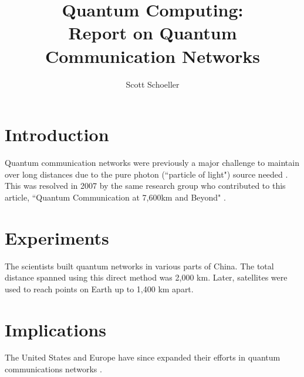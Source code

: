 \documentclass[12pt]{article}
\title{Quantum Computing:\\ Report on Quantum Communication Networks}
\author{Scott Schoeller}
\date{}
\begin{document}
\maketitle

\begin{flushleft}
\newpage
{}
\section{Introduction}
Quantum communication networks were previously a major challenge to maintain over long distances due to the pure photon (``particle of light") source needed . This was resolved in 2007 \cite{peng_experimental_2007} by the same research group who contributed to this article, ``Quantum Communication at 7,600km and Beyond" \cite{lu_chao-yang_quantum_2018}.

\section{Experiments}
The scientists built quantum networks in various parts of China. The total distance spanned using this direct method was 2,000 km. Later, satellites were used to reach points on Earth up to 1,400 km apart.

\section{Implications}
The United States and Europe have since expanded their efforts in quantum communications networks \cite{dabbar_quantum_2020}.
\newpage



\end{flushleft}
\end{document}

